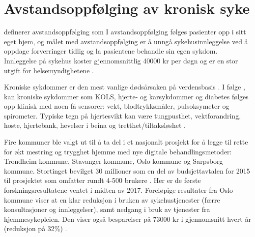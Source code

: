 \section{Avstandsoppfølging av kronisk syke}
\label{sec:remotemonitoring}
\citet{rojahn2016remote} definerer avstandsoppfølging som 
I avstandsoppfølging følges pasienter opp i sitt eget hjem, og
målet med avstandsoppfølging er å unngå sykehusinnleggelse ved å oppdage forverringer tidlig og la
pasientene behandle sin egen sykdom. Innleggelse på sykehus koster gjennomsnittlig 40000 kr per døgn og er en stor utgift
for helsemyndighetene \citep{regjeringen_innleggelse}.

Kroniske sykdommer er den mest vanlige dødsårsaken på verdensbasis \citep{who_chronic}.
I følge \citet{austad2016sensorer}, kan kroniske sykdommer som KOLS, hjerte- og karsykdommer og diabetes
følges opp klinisk med noen få sensorer: vekt, blodtrykksmåler, pulsoksymeter og spirometer. Typiske
tegn på hjertesvikt kan være tungpusthet, vektforandring, hoste, hjertebank, hevelser i beina og
tretthet/tiltaksløshet \citep{ehelse_hjertesvikt} \citep{nasjonalforeningen}.

Fire kommuner ble valgt ut til å ta del i et nasjonalt prosjekt for å legge til rette for økt mestring
og trygghet hjemme med nye digitale behandlingsmetoder: Trondheim kommune, Stavanger kommune, Oslo kommune og Sarpsborg kommune.
Stortinget bevilget 30 millioner som en del av budsjettavtalen for 2015 til prosjektet som omfatter rundt 4-500 brukere
\citep{regjeringen_behandlingsmetoder}.
Her er de første forskningsresultatene ventet i midten av 2017. Foreløpige resultater fra Oslo kommune viser at
en klar reduksjon i bruken av sykehustjenester (færre konsultasjoner og innleggelser), samt nedgang i bruk av
tjenester fra hjemmesykepleien. Den viser også besparelser på 73000 kr i gjennomsnitt hvert år (reduksjon på 32\%) \citep{oslo_visrapporten}.

